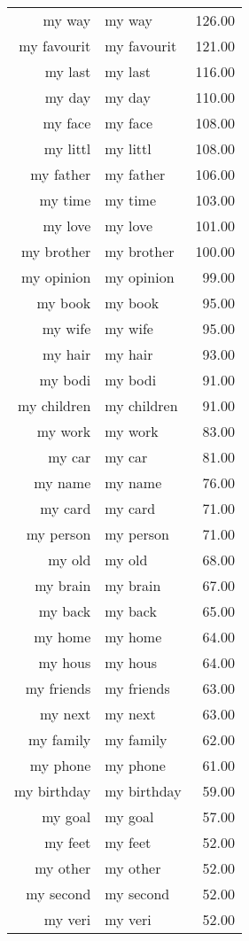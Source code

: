 \begin{table}[ht]
\begin{tabular}{rlr}
  my way & my way & 126.00 \\ 
  my favourit & my favourit & 121.00 \\ 
  my last & my last & 116.00 \\ 
  my day & my day & 110.00 \\ 
  my face & my face & 108.00 \\ 
  my littl & my littl & 108.00 \\ 
  my father & my father & 106.00 \\ 
  my time & my time & 103.00 \\ 
  my love & my love & 101.00 \\ 
  my brother & my brother & 100.00 \\ 
  my opinion & my opinion & 99.00 \\ 
  my book & my book & 95.00 \\ 
  my wife & my wife & 95.00 \\ 
  my hair & my hair & 93.00 \\ 
  my bodi & my bodi & 91.00 \\ 
  my children & my children & 91.00 \\ 
  my work & my work & 83.00 \\ 
  my car & my car & 81.00 \\ 
  my name & my name & 76.00 \\ 
  my card & my card & 71.00 \\ 
  my person & my person & 71.00 \\ 
  my old & my old & 68.00 \\ 
  my brain & my brain & 67.00 \\ 
  my back & my back & 65.00 \\ 
  my home & my home & 64.00 \\ 
  my hous & my hous & 64.00 \\ 
  my friends & my friends & 63.00 \\ 
  my next & my next & 63.00 \\ 
  my family & my family & 62.00 \\ 
  my phone & my phone & 61.00 \\ 
  my birthday & my birthday & 59.00 \\ 
  my goal & my goal & 57.00 \\ 
  my feet & my feet & 52.00 \\ 
  my other & my other & 52.00 \\ 
  my second & my second & 52.00 \\ 
  my veri & my veri & 52.00 \\ 

\end{tabular}
\end{table}
